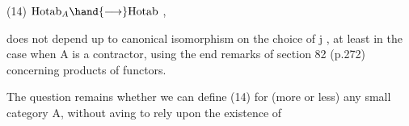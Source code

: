 (14) \qquad $\mathrm{Hotab}_A \hand{\longrightarrow} \mathrm{Hotab}$ \quad ,

does not depend up to canonical isomorphism on the choice of j , at
least in the case when A is a contractor, using the end remarks of
section 82 (p.272) concerning products of  functors.

The question remains whether we can define (14) for (more or less)
any small category A, without aving to rely upon the  existence of



